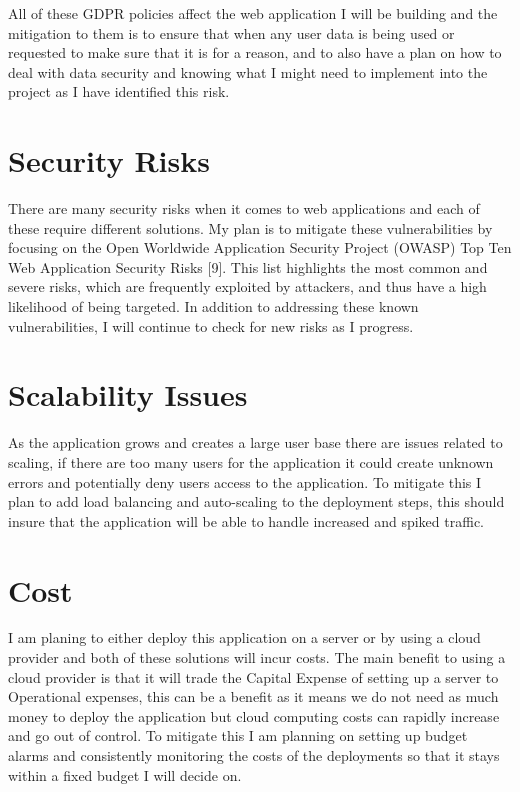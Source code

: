 \documentclass[]{project_report}
\begin{document}
All of these GDPR policies affect the web application I will be building and the mitigation to them is to ensure that when any user data is being used or requested to make sure that it is for a reason, and to also have a 
plan on how to deal with data security and knowing what I might need to implement into the project as I have identified this risk.


\section{Security Risks}

There are many security risks when it comes to web applications and each of these require different solutions. My plan is to mitigate these vulnerabilities by focusing on the Open Worldwide Application Security Project (OWASP) Top Ten Web Application Security Risks [9]. This list highlights the most common and severe risks, which are frequently exploited by attackers, and thus have a high likelihood of being targeted. In addition to addressing these known vulnerabilities, I will continue to check for new risks as I progress.


\section{Scalability Issues}

As the application grows and creates a large user base there are issues related to scaling, if there are too many users for the application it could create unknown errors and potentially deny users access to the application. To mitigate this I plan to add load balancing and auto-scaling to the deployment steps, this should insure that the application will be able to handle increased and spiked traffic.

\section{Cost}

I am planing to either deploy this application on a server or by using a cloud provider and both of these solutions will incur costs. The main benefit to using a cloud provider is that it will trade the Capital Expense of setting up a server to Operational expenses, this can be a benefit as it means we do not need as much money to deploy the application but cloud computing costs can rapidly increase and go out of control. To mitigate this I am planning on setting up budget alarms and consistently monitoring the costs of the deployments so that it stays within a fixed budget I will decide on. 
\end{document}
